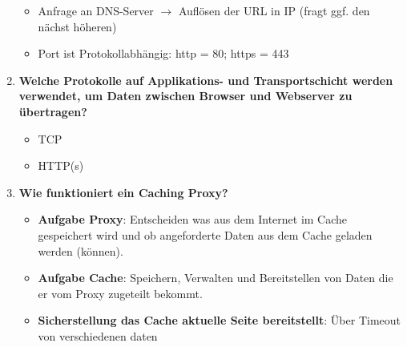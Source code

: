 \documentclass{article}
\begin{document}
\begin{enumerate}
	\begin{itemize}
		\item Anfrage an DNS-Server $ \longrightarrow $ Auflösen der URL in IP (fragt ggf. den nächst höheren)
		\item Port ist Protokollabhängig: http = 80; https = 443
	\end{itemize}
	\item \textbf{Welche Protokolle auf Applikations- und Transportschicht werden verwendet, um Daten zwischen Browser und Webserver zu übertragen?}
	\begin{itemize}
		\item TCP
		\item HTTP(s)
	\end{itemize}
	\item \textbf{Wie funktioniert ein Caching Proxy?}
	\begin{itemize}
		\item \textbf{Aufgabe Proxy}: Entscheiden was aus dem Internet im Cache gespeichert wird und ob angeforderte Daten aus dem Cache geladen werden (können).
		\item \textbf{Aufgabe Cache}: Speichern, Verwalten und Bereitstellen von Daten die er vom Proxy zugeteilt bekommt.
		\item \textbf{Sicherstellung das Cache aktuelle Seite bereitstellt}: Über Timeout von verschiedenen daten
	\end{itemize}


\end{enumerate}
\end{document}
